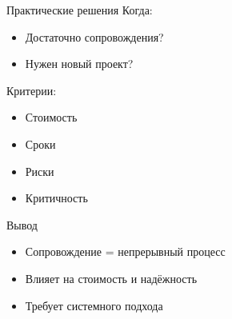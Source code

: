 \documentclass{beamer}
\begin{document}

\begin{frame}{Практические решения}
Когда:
\begin{itemize}
    \item Достаточно сопровождения?
    \item Нужен новый проект?
\end{itemize}

\vspace{0.5cm}

Критерии:
\begin{itemize}
    \item Стоимость
    \item Сроки
    \item Риски
    \item Критичность
\end{itemize}

\end{frame}


\begin{frame}{Вывод}
\begin{itemize}
    \item Сопровождение = непрерывный процесс
    \item Влияет на стоимость и надёжность
    \item Требует системного подхода
\end{itemize}

\end{frame}
\end{document}
